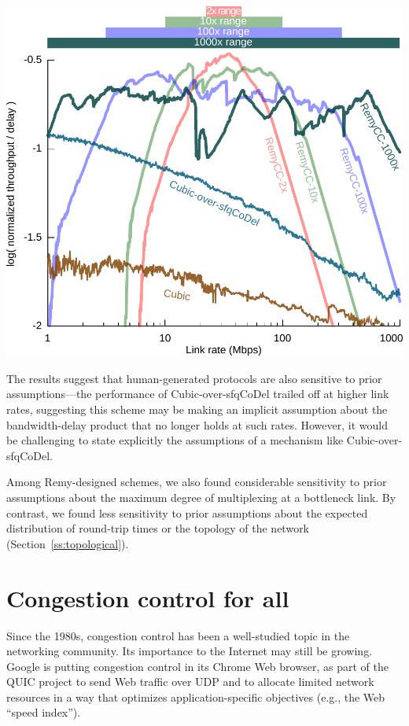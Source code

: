\begin{center}
\includegraphics[width=0.75 \columnwidth]{oprange-manual.pdf}
\end{center}

The results suggest that human-generated protocols are also sensitive
to prior assumptions---the performance of Cubic-over-sfqCoDel trailed
off at higher link rates, suggesting this scheme may be making an implicit
assumption about the bandwidth-delay product that no longer holds at
such rates. However, it would be challenging to state explicitly the
assumptions of a mechanism like Cubic-over-sfqCoDel.

Among Remy-designed schemes, we also found considerable sensitivity to
prior assumptions about the maximum degree of multiplexing at a
bottleneck link. By contrast, we found less sensitivity to prior
assumptions about the expected distribution of round-trip times or the
topology of the network (Section~\ref{ss:topological}).


\section{Congestion control for all}

Since the 1980s, congestion control has been a well-studied topic in
the networking community. Its importance to the Internet may still be
growing. Google is putting congestion control in its Chrome Web
browser, as part of the QUIC project to send Web traffic over UDP and
to allocate limited network resources in a way that optimizes
application-specific objectives (e.g., the Web ``speed index'').

